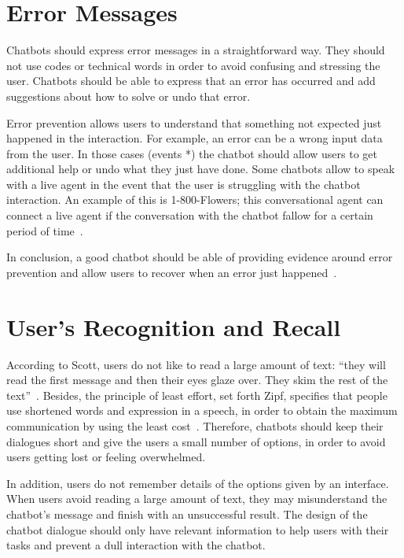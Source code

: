\documentclass[a4paper,10pt]{article}
\begin{document}
\section{Error Messages}

Chatbots should express error messages in a straightforward way. They should not use codes or technical words in order to avoid confusing and stressing the user. Chatbots should be able to express that an error has occurred and add suggestions about how to solve or undo that error. 

Error prevention allows users to understand that something not expected just happened in the interaction. For example, an error can be a wrong input data from the user. In those cases (events *) the chatbot should allow users to get additional help or undo what they just have done. Some chatbots  allow to speak with a live agent in the event that the user is struggling with the chatbot interaction. An example of this is 1-800-Flowers; this conversational agent can connect a live agent if the conversation with the chatbot fallow for a certain period of time~\cite{1-800-Flowers}. 

In conclusion, a good chatbot should be able of providing evidence around error prevention and allow users to recover when an error just happened~\cite{HeuristicsWebPage}. 

\section{User's Recognition and Recall}

According to Scott, users do not like to read a large amount of text: ``they will read the first message and then their eyes glaze over. They skim the rest of the text”~\cite{HeuristicsWebPage}. Besides, the principle of least effort, set forth Zipf, specifies that people use shortened words and expression in a speech, in order to obtain the maximum communication by using the least cost~\cite{allen1978conversation}. Therefore, chatbots should keep their dialogues short and give the users a small number of options, in order to avoid users getting lost or feeling overwhelmed.

In addition, users do not remember details of the options given by an interface. When users avoid reading a large amount of text, they may misunderstand the chatbot’s message and finish with an unsuccessful result. The design of the chatbot dialogue should only have relevant information to help users with their tasks and prevent a dull interaction with the chatbot. 
\end{document}

